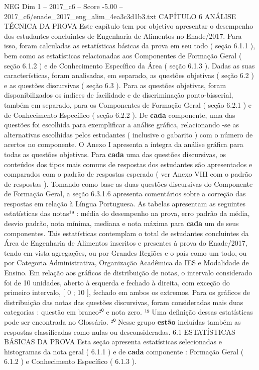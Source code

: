 \begin{textsample}{NEG Dim 1 – 2017\_c6 – Score -5.00 – 2017\_c6/enade\_2017\_eng\_alim\_4ea3c3d1b3.txt}  \label{ex:f1_neg_143}
CAPÍTULO 6 ANÁLISE TÉCNICA DA PROVA Este capítulo tem por objetivo apresentar o desempenho dos estudantes concluintes de Engenharia de Alimentos no Enade/2017.
Para isso, foram calculadas as estatísticas básicas da prova em seu todo ( seção 6.1.1 ), bem como as estatísticas relacionadas aos Componentes de Formação Geral ( seção 6.1.2 ) e de Conhecimento Específico da Área ( seção 6.1.3 ).
Dadas as suas características, foram analisadas, em separado, as questões objetivas ( seção 6.2 ) e as questões discursivas ( seção 6.3 ).
Para as questões objetivas, foram disponibilizados os índices de facilidade e de discriminação ponto-bisserial, também em separado, para os Componentes de Formação Geral ( seção 6.2.1 ) e de Conhecimento Específico ( seção 6.2.2 ).
De \textbf{cada} componente, uma das questões foi escolhida para exemplificar a análise gráfica, relacionando -se as alternativas escolhidas pelos estudantes ( inclusive o gabarito ) com o número de acertos no componente.
O Anexo I apresenta a íntegra da análise gráfica para todas as questões objetivas.
Para \textbf{cada} uma das questões discursivas, os conteúdos dos tipos mais comuns de respostas dos estudantes são apresentados e comparados com o padrão de respostas esperado ( ver Anexo VIII com o padrão de respostas ).
Tomando como base as duas questões discursivas do Componente de Formação Geral, a seção 6.3.1.6 apresenta comentários sobre a correção das respostas em relação à Língua Portuguesa.
As tabelas apresentam as seguintes estatísticas das notas¹⁹ : média do desempenho na prova, erro padrão da média, desvio padrão, nota mínima, mediana e nota máxima para \textbf{cada} um de seus componentes.
Tais estatísticas contemplam o total de estudantes concluintes da Área de Engenharia de Alimentos inscritos e presentes à prova do Enade/2017, tendo em vista agregações, ou por Grandes Regiões e o país como um todo, ou por Categoria Administrativa, Organização Acadêmica da IES e Modalidade de Ensino.
Em relação aos gráficos de distribuição de notas, o intervalo considerado foi de 10 unidades, aberto à esquerda e fechado à direita, com exceção do primeiro intervalo, [ 0 ; 10 ], fechado em ambos os extremos.
Para os gráficos de distribuição das notas das questões discursivas, foram consideradas mais duas categorias : questão em branco²⁰ e nota zero. ¹⁹ Uma definição dessas estatísticas pode ser encontrada no Glossário. ²⁰ Nesse grupo \textbf{estão} incluídas também as respostas classificadas como nulas ou desconsideradas. 6.1 ESTATÍSTICAS BÁSICAS DA PROVA Esta seção apresenta estatísticas selecionadas e histogramas da nota geral ( 6.1.1 ) e de \textbf{cada} componente : Formação Geral ( 6.1.2 ) e Conhecimento Específico ( 6.1.3 ).

\end{textsample}
